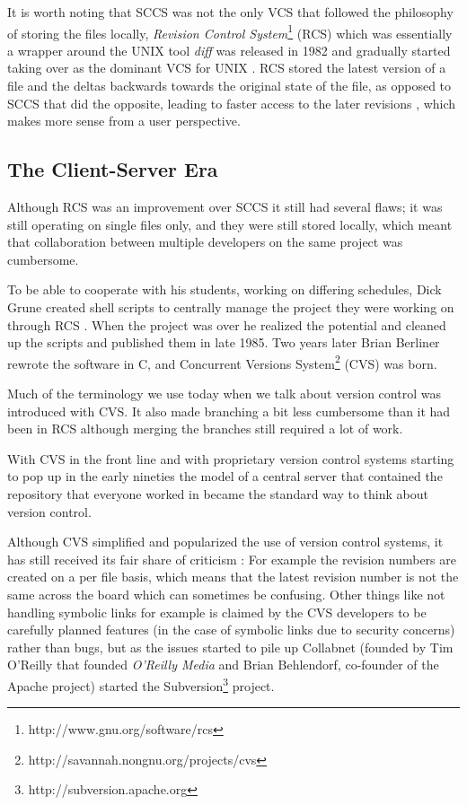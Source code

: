 \documentclass{llncs}
\begin{document}
It is worth noting that SCCS was not the only VCS that followed the
philosophy of storing the files locally, \emph{Revision Control
  System}\footnote{ http://www.gnu.org/software/rcs } (RCS) which was
essentially a wrapper around the UNIX{\texttrademark} tool \emph{diff}
was released in 1982 and gradually started taking over as the dominant
VCS for UNIX{\texttrademark} \cite{tichy85}. RCS stored the latest
version of a file and the deltas backwards towards the original state
of the file, as opposed to SCCS that did the opposite, leading to
faster access to the later revisions \cite{robert06}, which makes more
sense from a user perspective.

\subsection{The Client-Server Era}
Although RCS was an improvement over SCCS it still had several flaws;
it was still operating on single files only, and they were still
stored locally, which meant that collaboration between multiple
developers on the same project was cumbersome.

To be able to cooperate with his students, working on differing
schedules, Dick Grune created shell scripts to centrally manage the
project they were working on through RCS \cite{grune86}. When the
project was over he realized the potential and cleaned up the scripts
and published them in late 1985. Two years later Brian Berliner
rewrote the software in C, and Concurrent Versions System\footnote{
http://savannah.nongnu.org/projects/cvs} (CVS) was born.

Much of the terminology we use today when we talk about version
control was introduced with CVS. It also made branching a bit less
cumbersome than it had been in RCS although merging the branches still
required a lot of work.

With CVS in the front line and with proprietary version control
systems starting to pop up in the early nineties the model of a
central server that contained the repository that everyone worked in
became the standard way to think about version control.

Although CVS simplified and popularized the use of version control
systems, it has still received its fair share of
criticism \cite{robert06}\cite{subversion}: For example the revision
numbers are created on a per file basis, which means that the latest
revision number is not the same across the board which can sometimes
be confusing. Other things like not handling symbolic links for
example is claimed by the CVS developers to be carefully planned
features (in the case of symbolic links due to security concerns)
rather than bugs, but as the issues started to pile up Collabnet
(founded by Tim O'Reilly that founded \emph{O'Reilly Media} and Brian
Behlendorf, co-founder of the Apache project) started the
Subversion\footnote{ http://subversion.apache.org } project.
\end{document}

